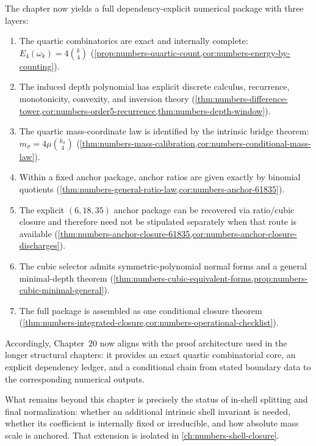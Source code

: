 The chapter now yields a full dependency-explicit numerical package with
three layers:
\begin{enumerate}[label=\textup{(\roman*)}]
\item The quartic combinatorics are exact and internally complete:
      \(E_4(\omega_k)=4\binom{k}{4}\)
      (\cref{prop:numbers-quartic-count,cor:numbers-energy-by-counting}).
\item The induced depth polynomial has explicit discrete calculus,
      recurrence, monotonicity, convexity, and inversion theory
      (\cref{thm:numbers-difference-tower,cor:numbers-order5-recurrence,thm:numbers-depth-window}).
\item The quartic mass-coordinate law is identified by the intrinsic bridge theorem:
      \(m_\sigma=4\mu\binom{k_\sigma}{4}\)
      (\cref{thm:numbers-mass-calibration,cor:numbers-conditional-mass-law}).
\item Within a fixed anchor package, anchor ratios are given exactly
      by binomial quotients
      (\cref{thm:numbers-general-ratio-law,cor:numbers-anchor-61835}).
\item The explicit \((6,18,35)\) anchor package can be recovered via
      ratio/cubic closure and therefore need not be stipulated separately
      when that route is available
      (\cref{thm:numbers-anchor-closure-61835,cor:numbers-anchor-closure-discharges}).
\item The cubic selector admits symmetric-polynomial normal forms and a
      general minimal-depth theorem
      (\cref{thm:numbers-cubic-equivalent-forms,prop:numbers-cubic-minimal-general}).
\item The full package is assembled as one conditional closure theorem
      (\cref{thm:numbers-integrated-closure,cor:numbers-operational-checklist}).
\end{enumerate}

Accordingly, Chapter~20 now aligns with the proof architecture used in the
longer structural chapters:
it provides an exact quartic combinatorial core,
an explicit dependency ledger,
and a conditional chain from stated boundary data to the corresponding
numerical outputs.

What remains beyond this chapter is precisely the status of
in-shell splitting and final normalization: whether an additional
intrinsic shell invariant is needed, whether its coefficient is
internally fixed or irreducible, and how absolute mass scale is anchored.
That extension is isolated in \cref{ch:numbers-shell-closure}.